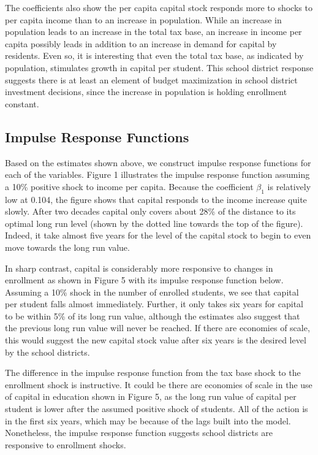 \begingroup
\singlespacing
\begin{table}[H]
    \centering
    
\end{table}
\endgroup

The coefficients also show the per capita capital stock responds more to shocks to per capita income than to an increase in population. While an increase in population leads to an increase in the total tax base, an increase in income per capita possibly leads in addition to an increase in demand for capital by residents. Even so, it is interesting that even the total tax base, as indicated by population, stimulates growth in capital per student. This school district response suggests there is at least an element of budget maximization in school district investment decisions, since the increase in population is holding enrollment constant.

\subsection{Impulse Response Functions}

Based on the estimates shown above, we construct impulse response functions for each of the variables. Figure 1 illustrates the impulse response function assuming a 10\% positive shock to income per capita. Because the coefficient $\beta_1$ is relatively low at 0.104, the figure shows that capital responds to the income increase quite slowly. After two decades capital only covers about 28\% of the distance to its optimal long run level (shown by the dotted line towards the top of the figure). Indeed, it take almost five years for the level of the capital stock to begin to even move towards the long run value. 

In sharp contrast, capital is considerably more responsive to changes in enrollment as shown in Figure 5 with its impulse response function below. Assuming a 10\% shock in the number of enrolled students, we see that capital per student falls almost immediately. Further, it only takes six years for capital to be within 5\% of its long run value, although the estimates also suggest that the previous long run value will never be reached. If there are economies of scale, this would suggest the new capital stock value after six years is the desired level by the school districts.

The difference in the impulse response function from the tax base shock to the enrollment shock is instructive. It could be there are economies of scale in the use of capital in education shown in Figure 5, as the long run value of capital per student is lower after the assumed positive shock of students. All of the action is in the first six years, which may be because of the lags built into the model. Nonetheless, the impulse response function suggests school districts are responsive to enrollment shocks.

